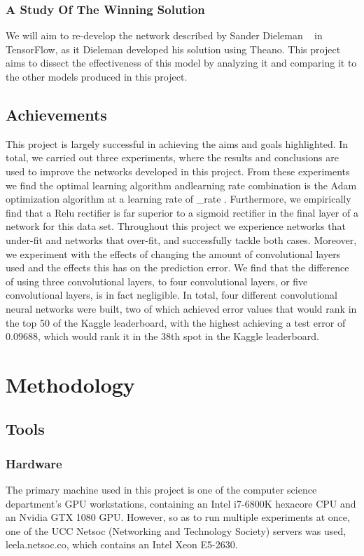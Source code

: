 \documentclass[12pt,a4paper,oneside,oldfontcommands]{memoir}
\begin{document}
\begin{Declaration Of OriginalityOrginality}
\subsection{A Study Of The Winning Solution} \label{winning-sol}

We will aim to re-develop the network described by Sander Dieleman ~\citep{Sanders-GZ} in TensorFlow, as it Dieleman developed his solution using Theano. This project aims to dissect the effectiveness of this model by analyzing it and comparing it to the other models produced in this project.

\section{Achievements}

This project is largely successful in achieving the aims and goals highlighted. In total, we carried out three experiments, where the results and conclusions are used to improve the networks developed in this project. From these experiments we find the optimal learning algorithm andlearning rate combination is the Adam optimization algorithm at a learning rate of \learning_rate . Furthermore, we empirically find that a Relu rectifier is far superior to a sigmoid rectifier in the final layer of a network for this data set. Throughout this project we experience networks that under-fit and networks that over-fit, and successfully tackle both cases. Moreover, we experiment with the effects of changing the amount of convolutional layers used and the effects this has on the prediction error. We find that the difference of using three convolutional layers, to four convolutional layers, or five convolutional layers, is in fact negligible. In total, four different convolutional neural networks were built, two of which achieved error values that would rank in the top 50 of the Kaggle leaderboard, with the highest achieving a test error of \(0.09688\), which would rank it in the 38th spot in the Kaggle leaderboard.


\chapter{Methodology}

\section{Tools} \label{tools}

\subsection{Hardware}
The primary machine used in this project is one of the computer science department's GPU workstations, containing an Intel i7-6800K hexacore CPU and an Nvidia GTX 1080 GPU. However, so as to run multiple experiments at once, one of the UCC Netsoc (Networking and Technology Society) servers was used, leela.netsoc.co, which contains an Intel Xeon E5-2630.


\end{Declaration Of OriginalityOrginality}
\end{document}
